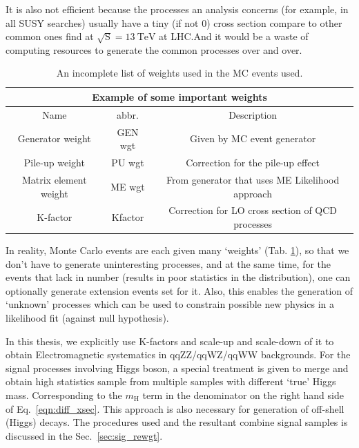 It is also not efficient because the processes an analysis concerns (for example, in all SUSY
searches) usually have a tiny (if not 0) cross section compare to other common ones find at
$\sqrt{\mathrm{S}} = \SI{13}{\tera\electronvolt}$ at LHC.\@ And it would be a waste of
computing resources to generate the common processes over and over.

\begin{table}[]
\centering
\begin{tabular}{|c|c|c|}
\hline
\multicolumn{3}{|c|}{Example of some important weights}                                                                                       \\ \hline
Name                  & abbr.   & Description                                                                                                 \\ \hline
Generator weight      & GEN wgt & Given by MC event generator                                                                                 \\ \hline
Pile-up weight        & PU wgt  & Correction for the pile-up effect                                                                           \\ \hline
Matrix element weight & ME wgt  & From generator that uses ME Likelihood approach \\ \hline
K-factor              & Kfactor & Correction for LO cross section of QCD processes                                                         \\ \hline
\end{tabular}
\caption{An incomplete list of weights used in the MC events used.}
\label{tab:MC_wgts}
\end{table}

In reality, Monte Carlo events are each given many `weights' (Tab. \ref{tab:MC_wgts}), so that
we don't have to generate uninteresting processes, and at the same time, for the events that lack
in number (results in poor statistics in the distribution), one can optionally generate
extension events set for it. Also, this enables the generation of `unknown' processes which can
be used to constrain possible new physics in a likelihood fit (against null hypothesis).

In this thesis, we explicitly use K-factors and scale-up and scale-down of it to 
obtain Electromagnetic systematics in qqZZ/qqWZ/qqWW backgrounds. For the signal processes involving
Higgs boson, a special treatment is given to merge and obtain high statistics sample from
multiple samples with different `true' Higgs mass. Corresponding to the $m_\mathrm{H}$ term
in the denominator on the right hand side of Eq.~\ref{eqn:diff_xsec}.
This approach is also necessary for generation of off-shell (Higgs) decays. The procedures 
used and the resultant combine signal samples is discussed in the Sec.~\ref{sec:sig_rewgt}.

